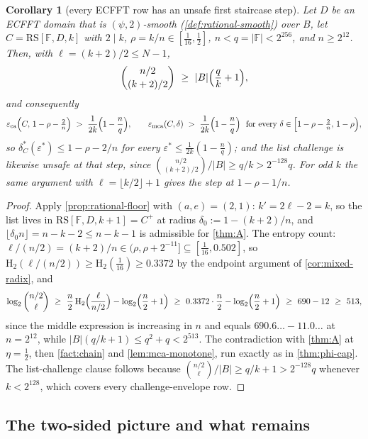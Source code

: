 \documentclass[11pt]{article}
\newtheorem{corollary}[theorem]{Corollary}
\theoremstyle{definition}
\theoremstyle{remark}
\newcommand{\F}{\mathbb{F}}
\newcommand{\B}{B}
\newcommand{\RS}{\mathrm{RS}}
\newcommand{\eca}{\varepsilon_{\mathrm{ca}}}
\newcommand{\emca}{\varepsilon_{\mathrm{mca}}}
\newcommand{\Hb}{\mathrm{H}_2}
\begin{document}
\begin{corollary}[every ECFFT row has an unsafe first staircase step]\label{cor:ecfft-onestep}
Let $D$ be an ECFFT domain that is $(\psi,2)$-smooth \textup(\cref{def:rational-smooth}\textup) over $\B$, let $C=\RS[\F,D,k]$ with $2\mid k$, $\rho=k/n\in[\tfrac1{16},\tfrac12]$, $n<q=|\F|<2^{256}$, and $n\ge2^{12}$. Then, with $\ell=(k+2)/2\le N-1$,
\[
\binom{n/2}{(k+2)/2}\ \ge\ |\B|\Bigl(\frac qk+1\Bigr),
\]
and consequently
\[
\eca\Bigl(C,\,1-\rho-\tfrac2n\Bigr)\ >\ \frac1{2k}\Bigl(1-\frac nq\Bigr),
\qquad
\emca(C,\delta)\ >\ \frac1{2k}\Bigl(1-\frac nq\Bigr)\ \ \text{for every }\delta\in\Bigl[1-\rho-\tfrac2n,\,1-\rho\Bigr),
\]
so $\delta^*_C(\varepsilon^*)\le1-\rho-2/n$ for every $\varepsilon^*\le\frac1{2k}(1-\frac nq)$; and the list challenge is likewise unsafe at that step, since $\binom{n/2}{(k+2)/2}/|\B|\ge q/k>2^{-128}q$. For odd $k$ the same argument with $\ell=\lfloor k/2\rfloor+1$ gives the step at $1-\rho-1/n$.
\end{corollary}

\begin{proof}
Apply \cref{prop:rational-floor} with $(a,e)=(2,1)$: $k'=2\ell-2=k$, so the list lives in $\RS[\F,D,k+1]=C^+$ at radius $\delta_0:=1-(k+2)/n$, and $\lfloor\delta_0n\rfloor=n-k-2\le n-k-1$ is admissible for \cref{thm:A}. The entropy count: $\ell/(n/2)=(k+2)/n\in(\rho,\rho+2^{-11}]\subseteq[\tfrac1{16},0.502]$, so $\Hb(\ell/(n/2))\ge\Hb(\tfrac1{16})\ge0.3372$ by the endpoint argument of \cref{cor:mixed-radix}, and
\[
\log_2\binom{n/2}{\ell}\ \ge\ \frac n2\,\Hb\Bigl(\frac{\ell}{n/2}\Bigr)-\log_2\Bigl(\frac n2+1\Bigr)\ \ge\ 0.3372\cdot\frac n2-\log_2\Bigl(\frac n2+1\Bigr)\ \ge\ 690-12\ \ge\ 513,
\]
since the middle expression is increasing in $n$ and equals $690.6\ldots-11.0\ldots$ at $n=2^{12}$, while $|\B|(q/k+1)\le q^2+q<2^{513}$. The contradiction with \cref{thm:A} at $\eta=\frac12$, then \cref{fact:chain} and \cref{lem:mca-monotone}, run exactly as in \cref{thm:phi-cap}. The list-challenge clause follows because $\binom{n/2}{\ell}/|\B|\ge q/k+1>2^{-128}q$ whenever $k<2^{128}$, which covers every challenge-envelope row.
\end{proof}
\subsection{The two-sided picture and what remains}\label{sec:discharge-status}
\end{document}
